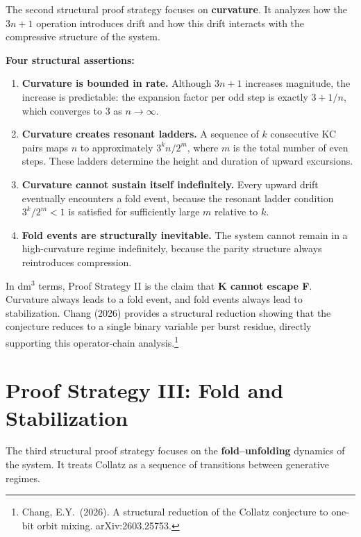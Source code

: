 \documentclass[14pt, twoside, openright]{book}
\theoremstyle{definition}
\theoremstyle{remark}
\begin{document}
The second structural proof strategy focuses on \textbf{curvature}. It analyzes
how the $3n+1$ operation introduces drift and how this drift interacts with the
compressive structure of the system.

\medskip
\noindent\textbf{Four structural assertions:}

\begin{enumerate}[leftmargin=2em]
  \item \textbf{Curvature is bounded in rate.} Although $3n+1$ increases
        magnitude, the increase is predictable: the expansion factor per odd step
        is exactly $3 + 1/n$, which converges to 3 as $n \to \infty$.

  \item \textbf{Curvature creates resonant ladders.} A sequence of $k$ consecutive
        KC pairs maps $n$ to approximately $3^{k} n / 2^{m}$, where $m$ is the
        total number of even steps. These ladders determine the height and duration
        of upward excursions.

  \item \textbf{Curvature cannot sustain itself indefinitely.} Every upward drift
        eventually encounters a fold event, because the resonant ladder condition
        $3^{k}/2^{m} < 1$ is satisfied for sufficiently large $m$ relative to $k$.

  \item \textbf{Fold events are structurally inevitable.} The system cannot
        remain in a high-curvature regime indefinitely, because the parity
        structure always reintroduces compression.
\end{enumerate}

\medskip
In dm$^{3}$ terms, Proof Strategy II is the claim that \textbf{K cannot escape F}.
Curvature always leads to a fold event, and fold events always lead to
stabilization. Chang (2026) provides a structural reduction showing that the
conjecture reduces to a single binary variable per burst residue, directly
supporting this operator-chain analysis.\footnote{Chang, E.Y.\ (2026). A
structural reduction of the Collatz conjecture to one-bit orbit mixing.
arXiv:2603.25753.}

\section{Proof Strategy III: Fold and Stabilization}

The third structural proof strategy focuses on the \textbf{fold--unfolding}
dynamics of the system. It treats Collatz as a sequence of transitions between
generative regimes.
\end{document}
